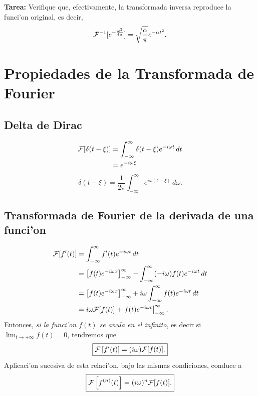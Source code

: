 \textbf{Tarea:} Verifique que, efectivamente, la transformada inversa reproduce la funci'on original, es decir,
\begin{equation}\label{Tfinvgauss}
{\cal F}^{-1}[e^{-\frac{\omega^2}{4\alpha}}]=\sqrt{\frac{\alpha}{\pi}}e^{-\alpha t^2}.
\end{equation}

\section{Propiedades de la Transformada de Fourier} 
\subsection{Delta de Dirac}
\begin{align}
{\cal F}[\delta(t-\xi)] 
 &=\int_{-\infty}^\infty\delta(t-\xi) e^{-i\omega t}\,dt 
\\
 &=e^{-i\omega\xi} \label{Fd}
\end{align}
\begin{equation}
\boxed{ 
\delta(t-\xi) =\frac{1}{2\pi}\int_{-\infty}^\infty e^{i\omega (t-\xi)}\,d\omega. 
 }
\end{equation}
%
\subsection{Transformada de Fourier de la derivada de una funci'on}
\begin{align}
{\cal F}[f'(t)]
 &=\int_{-\infty}^\infty f'(t) e^{-i\omega t}\,dt \\
 &=\left[ f(t) e^{-i\omega x}\right]_{-\infty}^\infty
 -\int_{-\infty}^\infty (-i\omega) f(t) e^{-i\omega t}\,dt \\
 &=\left[ f(t) e^{-i\omega x}\right]_{-\infty}^\infty+ i\omega\int_{-\infty}^\infty f(t) e^{-i\omega t}\,dt \\
 &= i\omega{\cal F}[f(t)]+\left. f(t) e^{-i\omega t}\right|_{-\infty}^\infty.\label{eq:trans-fourier-derivada-gen}
\end{align}
Entonces, \textit{si la funci'on $f(t)$ se anula en el infinito}, es decir si $\lim_{t\to\pm\infty}f(t)=0$, tendremos que
\begin{equation}
\boxed{ 
{\cal F}\left[f'(t)\right] = (i\omega){\cal F}[f(t)]. \label{eq:trans-fourier-derivada-esp}
 } 
\end{equation} 
Aplicaci'on sucesiva de esta relaci'on, bajo las mismas condiciones, conduce a
\begin{equation}
\boxed{ 
{\cal F}\left[f^{(n)}(t)\right] = (i\omega)^n{\cal F}[f(t)]. 
 } 
\end{equation} 



